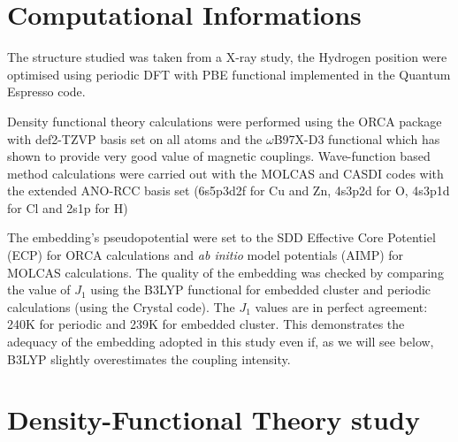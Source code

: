 \documentclass[12pt,a4paper]{report}
\numberwithin{equation}{section}
\begin{document}
\section{Computational Informations}

The structure studied was taken from a X-ray study\cite{braithwaite_herbertsmithite_2004}, the Hydrogen position were optimised using periodic DFT with PBE functional implemented in the Quantum Espresso code.

Density functional theory calculations were performed using the ORCA package with def2-TZVP basis set\cite{weigend_balanced_2005} on all atoms and the $\omega$B97X-D3 functional\cite{noauthor_revised_nodate} which has shown to provide very good value of magnetic couplings\cite{david_what_2017}.
Wave-function based method calculations were carried out with the MOLCAS\cite{aquilante_molcas_2010} and CASDI\cite{} codes with the extended ANO-RCC basis set\cite{widmark_density_1990,pou-amerigo_density_1995} (6s5p3d2f for Cu and Zn, 4s3p2d
for O, 4s3p1d for Cl and 2s1p for H)

The embedding's pseudopotential were set to the SDD Effective Core Potentiel (ECP) for ORCA\cite{neese_software_2022} calculations and \textit{ab initio} model potentials (AIMP) for MOLCAS calculations. 
The quality of the embedding was checked by comparing the value of $J_1$ using the B3LYP functional\cite{becke_densityfunctional_1993} for embedded cluster and periodic calculations (using the Crystal code\cite{dovesi_quantum-mechanical_2018}). 
The $J_1$ values are in perfect agreement: 240K for periodic and 239K for embedded cluster. 
This demonstrates the adequacy of the embedding adopted in this study even if, as we will see below, B3LYP slightly overestimates the coupling intensity.

\section{Density-Functional Theory study}
\end{document}
